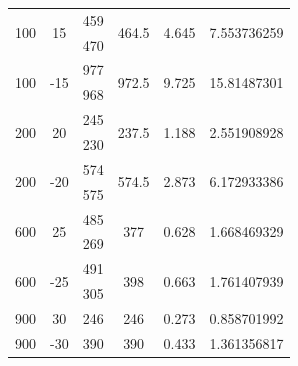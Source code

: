 \documentclass[a4paper, amsfonts, amssymb, amsmath, reprint, showkeys, nofootinbib, twoside]{revtex4-1}
\begin{document}
\begin{table}[H]
{\begin{tabular}{|c|c|c|c|c|c|}
			\multirow{2}{*}{100} & \multirow{2}{*}{15}  & 459                  & \multirow{2}{*}{464.5} & \multirow{2}{*}{4.645}  & \multirow{2}{*}{7.553736259} \\ \cline{3-3}
			&                      & 470                  &                        &                         &                              \\ \hline
			\multirow{2}{*}{100} & \multirow{2}{*}{-15} & 977                  & \multirow{2}{*}{972.5} & \multirow{2}{*}{9.725}  & \multirow{2}{*}{15.81487301} \\ \cline{3-3}
			&                      & 968                  &                        &                         &                              \\ \hline
			\multirow{2}{*}{200} & \multirow{2}{*}{20}  & 245                  & \multirow{2}{*}{237.5} & \multirow{2}{*}{1.188}  & \multirow{2}{*}{2.551908928} \\ \cline{3-3}
			&                      & 230                  &                        &                         &                              \\ \hline
			\multirow{2}{*}{200} & \multirow{2}{*}{-20} & 574                  & \multirow{2}{*}{574.5} & \multirow{2}{*}{2.873}  & \multirow{2}{*}{6.172933386} \\ \cline{3-3}
			&                      & 575                  &                        &                         &                              \\ \hline
			\multirow{2}{*}{600} & \multirow{2}{*}{25}  & 485                  & \multirow{2}{*}{377}   & \multirow{2}{*}{0.628}  & \multirow{2}{*}{1.668469329} \\ \cline{3-3}
			&                      & 269                  &                        &                         &                              \\ \hline
			\multirow{2}{*}{600} & \multirow{2}{*}{-25} & 491                  & \multirow{2}{*}{398}   & \multirow{2}{*}{0.663}  & \multirow{2}{*}{1.761407939} \\ \cline{3-3}
			&                      & 305                  &                        &                         &                              \\ \hline
			\multirow{2}{*}{900} & \multirow{2}{*}{30}  & \multirow{2}{*}{246} & \multirow{2}{*}{246}   & \multirow{2}{*}{0.273}  & \multirow{2}{*}{0.858701992} \\
			&                      &                      &                        &                         &                              \\ \hline
			\multirow{2}{*}{900} & \multirow{2}{*}{-30} & \multirow{2}{*}{390} & \multirow{2}{*}{390}   & \multirow{2}{*}{0.433}  & \multirow{2}{*}{1.361356817} \\
			&                      &                      &                        &                         &                              \\ \hline
		\end{tabular}%
	}
\end{table}
\end{document}
